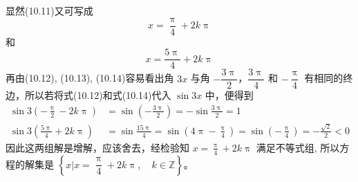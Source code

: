 \begin{solution}
显然(10.11)又可写成
\begin{equation}
  x=\frac{\uppi}{4}+2k\uppi
\end{equation}
和
\begin{equation}
  x=\frac{5\uppi}{4}+2k\uppi
\end{equation}
再由(10.12), (10.13), (10.14)容易看出角 $3x$ 与角 $-\dfrac{3\uppi}{2}$，$\dfrac{3\uppi}{4}$ 和 $-\dfrac{\uppi}{4}$ 有相同的终边，所以若将式(10.12)和式(10.14)代入 $\sin3x$ 中，便得到
\[\begin{split}
  \sin 3\left(-\frac{\uppi}{2}-2k\uppi\right)&=\sin\left(-\frac{3\uppi}{2}\right)=-\sin\frac{3\uppi}{2}=1\\
  \sin 3\left(\frac{5\uppi}{4}+2k\uppi\right)&=\sin\frac{15\uppi}{4}=\sin\left(4\uppi-\frac{\uppi}{4}\right)=\sin\left(-\frac{\uppi}{4}\right)=-\frac{\sqrt{2}}{2}<0
\end{split}\]
因此这两组解是增解，应该舍去，经检验知 $x=\frac{\uppi}{4}+2k\uppi$ 满足不等式组, 所以方程的解集是 $\left\{x\Big|x=\dfrac{\uppi}{4}+2k\uppi,\quad k\in\mathbb{Z}\right\}$。

\end{solution}

